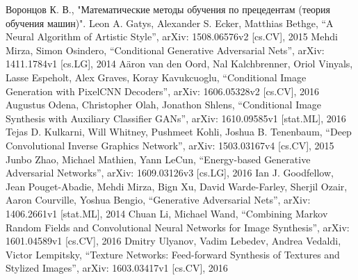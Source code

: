 \documentclass[a4paper]{article}
\begin{document}
	\renewcommand\refname{\centering СПИСОК ИСПОЛЬЗОВАННЫХ ИСТОЧНИКОВ}
	
	\setcounter{page}{2}
	\tableofcontents
	
	
	
	
	
	
	
	
	
	
	\begin{thebibliography}{99}
		  Воронцов К. В., "Математические методы обучения по прецедентам (теория обучения машин)".
		 Leon A. Gatys, Alexander S. Ecker, Matthias Bethge, ``A Neural Algorithm of Artistic Style'', arXiv: 1508.06576v2 [cs.CV], 2015
		 Mehdi Mirza, Simon Osindero, ``Conditional Generative Adversarial Nets'', arXiv: 1411.1784v1 [cs.LG], 2014
		 A\"aron van den Oord, Nal Kalchbrenner, Oriol Vinyals, Lasse Espeholt, Alex Graves, Koray Kavukcuoglu, ``Conditional Image Generation with PixelCNN Decoders'', arXiv: 1606.05328v2 [cs.CV], 2016
		 Augustus Odena, Christopher Olah, Jonathon Shlens, ``Conditional Image Synthesis with Auxiliary Classifier GANs'', arXiv: 1610.09585v1 [stat.ML], 2016
		 Tejas D. Kulkarni, Will Whitney, Pushmeet Kohli, Joshua B. Tenenbaum, ``Deep Convolutional Inverse Graphics Network'', arXiv: 1503.03167v4 [cs.CV], 2015
		 Junbo Zhao, Michael Mathien, Yann LeCun, ``Energy-based Generative Adversarial Networks'', arXiv: 1609.03126v3 [cs.LG], 2016
		 Ian J. Goodfellow, Jean Pouget-Abadie, Mehdi Mirza, Bign Xu, David Warde-Farley, Sherjil Ozair, Aaron Courville, Yoshua Bengio, ``Generative Adversarial Nets'', arXiv: 1406.2661v1 [stat.ML], 2014
		 Chuan Li, Michael Wand, ``Combining Markov Random Fields and Convolutional Neural Networks for Image Synthesis'', arXiv: 1601.04589v1 [cs.CV], 2016
		 Dmitry Ulyanov, Vadim Lebedev, Andrea Vedaldi, Victor Lempitsky, ``Texture Networks: Feed-forward Synthesis of Textures and Stylized Images'', arXiv: 1603.03417v1 [cs.CV], 2016
	\end{thebibliography}
	
\end{document}
